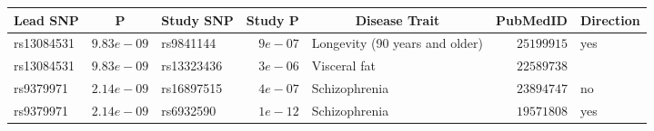 \begin{tabular}{lrlrlrl}
\hline\hline
\multicolumn{1}{c}{Lead SNP}&\multicolumn{1}{c}{P}&\multicolumn{1}{c}{Study SNP}&\multicolumn{1}{c}{Study P}&\multicolumn{1}{c}{Disease Trait}&\multicolumn{1}{c}{PubMedID}&\multicolumn{1}{c}{Direction}\tabularnewline
\hline
rs13084531&$9.83e-09$&rs9841144&$9e-07$&Longevity (90 years and older)&$25199915$&yes\tabularnewline
rs13084531&$9.83e-09$&rs13323436&$3e-06$&Visceral fat&$22589738$&\tabularnewline
rs9379971&$2.14e-09$&rs16897515&$4e-07$&Schizophrenia&$23894747$&no\tabularnewline
rs9379971&$2.14e-09$&rs6932590&$1e-12$&Schizophrenia&$19571808$&yes\tabularnewline
\hline
\end{tabular}
